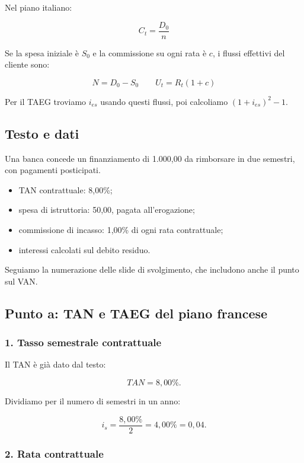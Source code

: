 \noindent Nel piano italiano:

\[
\boxed{C_t=\frac{D_0}{n}}
\]

\noindent Se la spesa iniziale è $S_0$
e la commissione su ogni rata è $c$,
i flussi effettivi del cliente sono:

\[
\boxed{N=D_0-S_0}
\qquad
\boxed{U_t=R_t(1+c)}
\]

\noindent Per il TAEG troviamo $i_{es}$
usando questi flussi,
poi calcoliamo $(1+i_{es})^2-1$.


\subsection*{Testo e dati}

\noindent Una banca concede un finanziamento
di 1.000,00 da rimborsare in due semestri,
con pagamenti posticipati.

\begin{itemize}
    \item TAN contrattuale: 8,00\%;
    \item spesa di istruttoria: 50,00,
    pagata all'erogazione;
    \item commissione di incasso:
    1,00\% di ogni rata contrattuale;
    \item interessi calcolati
    sul debito residuo.
\end{itemize}

\noindent Seguiamo la numerazione
delle slide di svolgimento,
che includono anche il punto sul VAN.


\subsection*{Punto a: TAN e TAEG del piano francese}

\subsubsection*{1. Tasso semestrale contrattuale}

\noindent Il TAN è già dato dal testo:

\[
\boxed{TAN=8{,}00\%}.
\]

\noindent Dividiamo per il numero
di semestri in un anno:

\[
i_s=\frac{8{,}00\%}{2}
=\boxed{4{,}00\%}
=0{,}04.
\]


\subsubsection*{2. Rata contrattuale}

